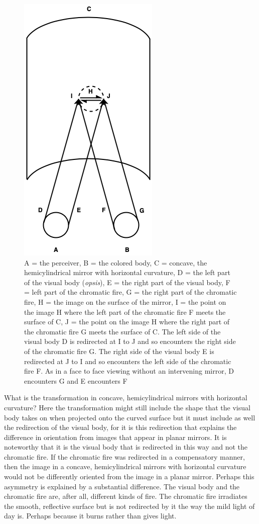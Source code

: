 \begin{figure}[htbp]
	\centering
		\includegraphics[scale=0.4]{graphics/hemicylinder.png}
	\caption{A = the perceiver, B = the colored body, C = concave, the hemicylindrical mirror with horizontal curvature, D = the left part of the visual body (\emph{opsis}), E = the right part of the visual body, F = left part of the chromatic fire, G = the right part of the chromatic fire, H = the image on the surface of the mirror, I = the point on the image H where the left part of the chromatic fire F meets the surface of C, J = the point on the image H where the right part of the chromatic fire G meets the surface of C. The left side of the visual body D is redirected at I to J and so encounters the right side of the chromatic fire G. The right side of the visual body E is redirected at J to I and so encounters the left side of the chromatic fire F. As in a face to face viewing without an intervening mirror, D encounters G and E encounters F}
	\label{fig:hemicylinder}
\end{figure}

What is the transformation in concave, hemicylindrical mirrors with horizontal curvature? Here the transformation might still include the shape that the visual body takes on when projected onto the curved surface but it must include as well the redirection of the visual body, for it is this redirection that explains the difference in orientation from images that appear in planar mirrors. It is noteworthy that it is the visual body that is redirected in this way and not the chromatic fire. If the chromatic fire was redirected in a compensatory manner, then the image in a concave, hemicylindrical mirrors with horizontal curvature would not be differently oriented from the image in a planar mirror. Perhaps this asymmetry is explained by a substantial difference. The visual body and the chromatic fire are, after all, different kinds of fire. The chromatic fire irradiates the smooth, reflective surface but is not redirected by it the way the mild light of day is. Perhaps because it burns rather than gives light.

